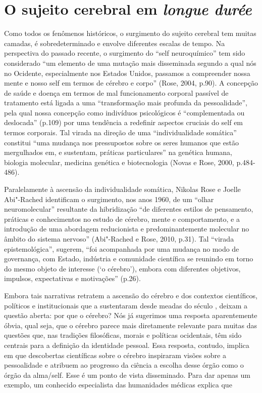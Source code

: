 \chapter{O sujeito cerebral em \emph{longue durée}}

Como todos os fenômenos históricos, o surgimento do sujeito cerebral tem
muitas camadas, é sobredeterminado e envolve diferentes escalas de
tempo. Na perspectiva do passado recente, o surgimento do ``self
neuroquímico'' tem sido considerado ``um elemento de uma mutação mais
disseminada segundo a qual nós no Ocidente, especialmente nos Estados
Unidos, passamos a compreender nossa mente e nosso self em termos de
cérebro e corpo'' (Rose, 2004, p.90). A concepção de saúde e doença em
termos de mal funcionamento corporal passível de tratamento está ligada
a uma ``transformação mais profunda da pessoalidade'', pela qual nossa
concepção como indivíduos psicológicos é ``complementada ou deslocada''
(p.109) por uma tendência a redefinir aspectos cruciais do self em
termos corporais. Tal virada na direção de uma ``individualidade
somática'' constitui ``uma mudança nos pressupostos sobre os seres
humanos que estão mergulhados em, e sustentam, práticas particulares''
na genética humana, biologia molecular, medicina genética e
biotecnologia (Novas e Rose, 2000, p.484-486).

Paralelamente à ascensão da individualidade somática, Nikolas Rose e
Joelle Abi"-Rached identificam o surgimento, nos anos 1960, de um ``olhar
neuromolecular'' resultante da hibridização ``de diferentes estilos de
pensamento, práticas e conhecimentos no estudo de cérebro, mente e
comportamento, e a introdução de uma abordagem reducionista e
predominantemente molecular no âmbito do sistema nervoso'' (Abi"-Rached e
Rose, 2010, p.31). Tal ``virada epistemológica'', sugerem, ``foi
acompanhada por uma mudança no modo de governança, com Estado, indústria
e comunidade científica se reunindo em torno do mesmo objeto de
interesse (`o cérebro'), embora com diferentes objetivos, impulsos,
expectativas e motivações'' (p.26).

Embora tais narrativas retratem a ascensão do cérebro e dos contextos
científicos, políticos e institucionais que a sustentaram desde meadas
do século , deixam a questão aberta: por que o cérebro? Nós já
sugerimos uma resposta aparentemente óbvia, qual seja, que o cérebro
parece mais diretamente relevante para muitas das questões que, nas
tradições filosóficas, morais e políticas ocidentais, têm sido centrais
para a definição da identidade pessoal. Essa resposta, contudo, implica
em que descobertas científicas sobre o cérebro inspiraram visões sobre a
pessoalidade e atribuem ao progresso da ciência a escolha desse órgão
como o órgão da alma/self. Esse é um ponto de vista disseminado. Para
dar apenas um exemplo, um conhecido especialista das humanidades médicas
explica que

